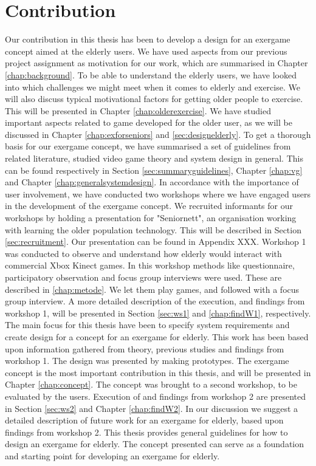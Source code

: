 \section{Contribution}
Our contribution in this thesis has been to develop a design for an exergame concept aimed at the elderly users. We have used aspects from our previous project assignment as motivation for our work, which are summarised in Chapter \ref{chap:background}. To be able to understand the elderly users, we have looked into which challenges we might meet when it comes to elderly and exercise. We will also discuss typical motivational factors for getting older people to exercise. This will be presented in Chapter \ref{chap:olderexercise}. We have studied important aspects related to game developed for the older user, as we will be discussed in Chapter \ref{chap:exforseniors} and \ref{sec:designelderly}. To get a thorough basis for our exergame concept, we have summarised a set of guidelines from related literature, studied video game theory and system design in general. This can be found respectively in Section \ref{sec:summaryguidelines}, Chapter \ref{chap:vg} and Chapter \ref{chap:generalsystemdesign}. In accordance with the importance of user involvement, we have conducted two workshops where we have engaged users in the development of the exergame concept. We recruited informants for our workshops by holding a presentation for "Seniornett", an organisation working with learning the older population technology. This will be described in Section \ref{sec:recruitment}. Our presentation can be found in Appendix XXX. Workshop 1 was conducted to observe and understand how elderly would interact with commercial Xbox Kinect games. In this workshop methods like questionnaire, participatory observation and focus group interviews were used. These are described in \ref{chap:metode}. We let them play games, and followed with a focus group interview. A more detailed description of the execution, and findings from workshop 1, will be presented in Section \ref{sec:ws1} and \ref{chap:findW1}, respectively. The main focus for this thesis have been to specify system requirements and create design for a concept for an exergame for elderly. This work has been based upon information gathered from theory, previous studies and findings from workshop 1. The design was presented by making prototypes. The exergame concept is the most important contribution in this thesis, and will be presented in Chapter \ref{chap:concept}. The concept was brought to a second workshop, to be evaluated by the users. Execution of and findings from workshop 2 are presented in Section \ref{sec:ws2} and Chapter \ref{chap:findW2}. In our discussion we suggest a detailed description of future work for an exergame for elderly, based upon findings from workshop 2. This thesis provides general guidelines for how to design an exergame for elderly. The concept presented can serve as a foundation and starting point for developing an exergame for elderly.     

